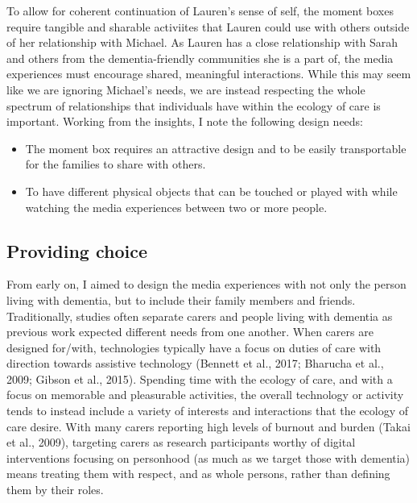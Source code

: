 To allow for coherent continuation of Lauren’s sense of self, the moment boxes require tangible and sharable activiites that Lauren could use with others outside of her relationship with Michael. As Lauren has a close relationship with Sarah and others from the dementia-friendly communities she is a part of, the media experiences must encourage shared, meaningful interactions. While this may seem like we are ignoring Michael’s needs, we are instead respecting the whole spectrum of relationships that individuals have within the ecology of care is important. Working from the insights, I note the following design needs:
\begin{itemize}
    \item The moment box requires an attractive design and to be easily transportable for the families to share with others.
    \item To have different physical objects that can be touched or played with while watching the media experiences between two or more people. 
\end{itemize}

\subsection{Providing choice}
\label{DR:ProvidingChoice}
From early on, I aimed to design the media experiences with not only the person living with dementia, but to include their family members and friends. Traditionally, studies often separate carers and people living with dementia as previous work expected different needs from one another. When carers are designed for/with, technologies typically have a focus on duties of care with direction towards assistive technology (Bennett et al., 2017; Bharucha et al., 2009; Gibson et al., 2015). Spending time with the ecology of care, and with a focus on memorable and pleasurable activities, the overall technology or activity tends to instead include a variety of interests and interactions that the ecology of care desire. With many carers reporting high levels of burnout and burden (Takai et al., 2009), targeting carers as research participants worthy of digital interventions focusing on personhood (as much as we target those with dementia) means treating them with respect, and as whole persons, rather than defining them by their roles.

